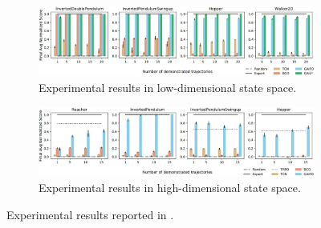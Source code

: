 \begin{figure}[tb]
     \centering
     \begin{subfigure}[b]{0.8\textwidth}
        \centering
         \includegraphics[width=\textwidth]{Figures/images/gaifo_results/gaifo_results.jpg}
         \caption{Experimental results in low-dimensional state space.}
         \label{fig:low_dimensional}
     \end{subfigure}
     \vfill
     \begin{subfigure}[b]{0.8\textwidth}
        \centering
         \includegraphics[width=\textwidth]{Figures/images/gaifo_results/gaifo_results_visual.jpg}
         \caption{Experimental results in high-dimensional state space.}
         \label{fig:high_dimensional}
     \end{subfigure}
    \hfill
    \caption{Experimental results reported in \cite{torabi2018gaifo}.}
    \label{fig:gaifo_results}
\end{figure}

